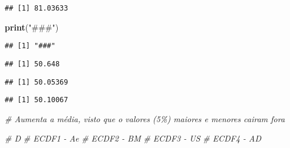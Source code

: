 \documentclass[
]{article}
\newenvironment{Shaded}{\begin{snugshade}}{\end{snugshade}}
\newcommand{\AttributeTok}[1]{\textcolor[rgb]{0.13,0.29,0.53}{#1}}
\newcommand{\CommentTok}[1]{\textcolor[rgb]{0.56,0.35,0.01}{\textit{#1}}}
\newcommand{\FloatTok}[1]{\textcolor[rgb]{0.00,0.00,0.81}{#1}}
\newcommand{\FunctionTok}[1]{\textcolor[rgb]{0.13,0.29,0.53}{\textbf{#1}}}
\newcommand{\NormalTok}[1]{#1}
\newcommand{\SpecialCharTok}[1]{\textcolor[rgb]{0.81,0.36,0.00}{\textbf{#1}}}
\newcommand{\StringTok}[1]{\textcolor[rgb]{0.31,0.60,0.02}{#1}}
\begin{document}
\begin{verbatim}
## [1] 81.03633
\end{verbatim}

\begin{Shaded}
\begin{Highlighting}[]
\FunctionTok{print}\NormalTok{(}\StringTok{"\#\#\#"}\NormalTok{)}
\end{Highlighting}
\end{Shaded}

\begin{verbatim}
## [1] "###"
\end{verbatim}

\begin{Shaded}
\end{Shaded}

\begin{verbatim}
## [1] 50.648
\end{verbatim}

\begin{Shaded}
\end{Shaded}

\begin{verbatim}
## [1] 50.05369
\end{verbatim}

\begin{Shaded}
\end{Shaded}

\begin{verbatim}
## [1] 50.10067
\end{verbatim}

\begin{Shaded}
\begin{Highlighting}[]
\CommentTok{\# Aumenta a média, visto que o valores (5\%) maiores e menores cairam fora}

\CommentTok{\# D}
\CommentTok{\# ECDF1 {-} Ae}
\CommentTok{\# ECDF2 {-} BM}
\CommentTok{\# ECDF3 {-} US}
\CommentTok{\# ECDF4 {-} AD}
\end{Highlighting}
\end{Shaded}
\end{document}
